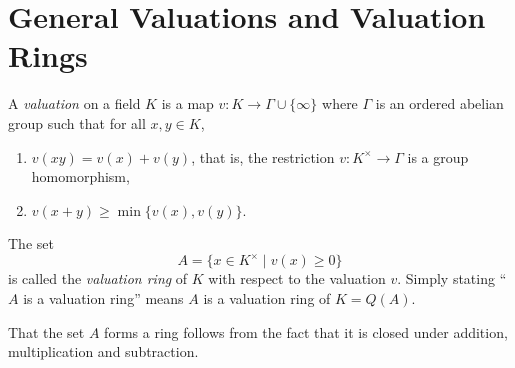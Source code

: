 \section{General Valuations and Valuation Rings}

\begin{definition}[Valuation]
    A \emph{valuation} on a field $K$ is a map $v: K\to\Gamma\cup\{\infty\}$ where $\Gamma$ is an ordered abelian group such that for all $x,y\in K$,
    \begin{enumerate}
        \item $v(xy) = v(x) + v(y)$, that is, the restriction $v: K^\times\to\Gamma$ is a group homomorphism,
        \item $v(x + y)\ge\min\{v(x), v(y)\}$.
    \end{enumerate}
    The set 
    \begin{equation*}
        A = \{x\in K^\times\mid v(x)\ge 0\}
    \end{equation*}
    is called the \emph{valuation ring} of $K$ with respect to the valuation $v$. Simply stating ``$A$ is a valuation ring'' means $A$ is a valuation ring of $K = Q(A)$.
\end{definition}

That the set $A$ forms a ring follows from the fact that it is closed under addition, multiplication and subtraction.

